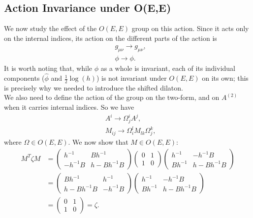 \documentclass{article}
\begin{document}
\subsection{Action Invariance under O(E,E)}
We now study the effect of the $O(E,E)$ group on this action. Since it acts only on the internal indices, its action on the different parts of the action is
\begin{align}
    &g_{\mu \nu} \rightarrow g_{\mu \nu},\\
    &\phi \rightarrow \phi.
\end{align}
It is worth noting that, while $\phi$ as a whole is invariant, each of its individual components ($\hat \phi$ and $\frac{1}{2}\log(h)$) is not invariant under $O(E,E)$ on its own; this is precisely why 
we needed to introduce the shifted dilaton.\\
We also need to define the action of the group on the two-form, and on $A^{(2)}$ when it carries internal indices. So we have
\begin{align} \label{O(E,E)action}
    &A^i \rightarrow \Omega^i_j A^j, \\
    &M_{ij} \rightarrow \Omega^l_i M_{lk}\Omega^k_j,
\end{align}
where $\Omega \in O(E,E)$. We now show that $M \in O(E,E)$:
\begin{equation*}
    \begin{aligned}
        M^{T}\zeta M &= \begin{pmatrix} h^{-1} & B h^{-1} \\ - h^{-1} B & h-Bh^{-1}B\end{pmatrix} \begin{pmatrix}0 & 1 \\ 1 & 0\end{pmatrix}\begin{pmatrix}    h^{-1} & -h^{-1}B \\Bh^{-1} & h-Bh^{-1}B\end{pmatrix}\\
        & =\begin{pmatrix}B h^{-1}   &h^{-1}  \\h-Bh^{-1}B   &- h^{-1} B \end{pmatrix} \begin{pmatrix}    h^{-1} & -h^{-1}B \\Bh^{-1} & h-Bh^{-1}B\end{pmatrix}\\
        &= \begin{pmatrix}0 & 1 \\ 1 & 0\end{pmatrix} = \zeta.
    \end{aligned}
\end{equation*}
\end{document}
